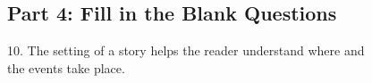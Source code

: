 \documentclass[12pt]{article}
\begin{document}
\subsection*{Part 4: Fill in the Blank Questions}
\vspace{1em}
10. The setting of a story helps the reader understand where and\\ \underline{\hspace{4cm}} the events take place.

\vspace{3cm}














\end{document}
